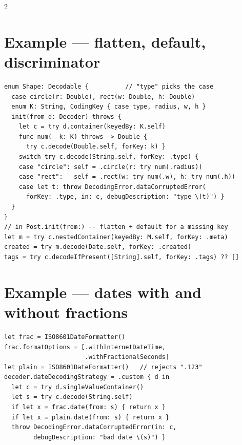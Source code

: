 \documentclass[8pt]{extarticle}
\begin{document}
\begin{multicols}{2}
\section{Example — flatten, default, discriminator}
\begin{lstlisting}[language=SwiftSheet]
enum Shape: Decodable {          // "type" picks the case
  case circle(r: Double), rect(w: Double, h: Double)
  enum K: String, CodingKey { case type, radius, w, h }
  init(from d: Decoder) throws {
    let c = try d.container(keyedBy: K.self)
    func num(_ k: K) throws -> Double {
      try c.decode(Double.self, forKey: k) }
    switch try c.decode(String.self, forKey: .type) {
    case "circle": self = .circle(r: try num(.radius))
    case "rect":   self = .rect(w: try num(.w), h: try num(.h))
    case let t: throw DecodingError.dataCorruptedError(
      forKey: .type, in: c, debugDescription: "type \(t)") }
  }
}
// in Post.init(from:) -- flatten + default for a missing key
let m = try c.nestedContainer(keyedBy: M.self, forKey: .meta)
created = try m.decode(Date.self, forKey: .created)
tags = try c.decodeIfPresent([String].self, forKey: .tags) ?? []
\end{lstlisting}

\columnbreak

\section{Example — dates with and without fractions}
\begin{lstlisting}[language=SwiftSheet]
let frac = ISO8601DateFormatter()
frac.formatOptions = [.withInternetDateTime,
                      .withFractionalSeconds]
let plain = ISO8601DateFormatter()   // rejects ".123"
decoder.dateDecodingStrategy = .custom { d in
  let c = try d.singleValueContainer()
  let s = try c.decode(String.self)
  if let x = frac.date(from: s) { return x }
  if let x = plain.date(from: s) { return x }
  throw DecodingError.dataCorruptedError(in: c,
        debugDescription: "bad date \(s)") }
\end{lstlisting}


\end{multicols}
\end{document}
